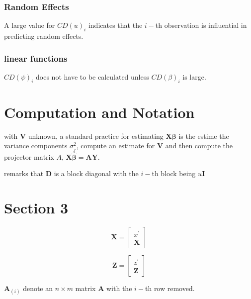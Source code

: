 \documentclass[12pt, a4paper]{article}
\begin{document}
\subsubsection{Random Effects}


A large value for $CD(u)_i$ indicates that the $i-$th observation is influential in predicting random effects.


\subsubsection{linear functions}


$CD(\psi)_i$ does not have to be calculated unless $CD(\beta)_i$ is large.



\section{Computation and Notation } %
with $\boldsymbol{V}$ unknown, a standard practice for estimating $\boldsymbol{X \beta}$ is the estime the variance components $\sigma^2_j$,
compute an estimate for $\boldsymbol{V}$ and then compute the projector matrix $A$, $\boldsymbol{X \hat{\beta}}  = \boldsymbol{AY}$.


\citet{tewomir} remarks that $\boldsymbol{D}$ is a block diagonal with the $i-$th block being $u \boldsymbol{I}$







\section{Section 3}

\[  \boldsymbol{X} = \left[  \begin{array}{c} x^{\prime} \\ \boldsymbol{X} \end{array} \right]   \]

\[  \boldsymbol{Z} = \left[  \begin{array}{c} z^{\prime} \\ \boldsymbol{Z} \end{array} \right]   \] 

$\boldsymbol{A}_{(i)}$ denote an $n\times m$ matrix $\boldsymbol{A}$ with the $i-$th row removed.

\end{document}
